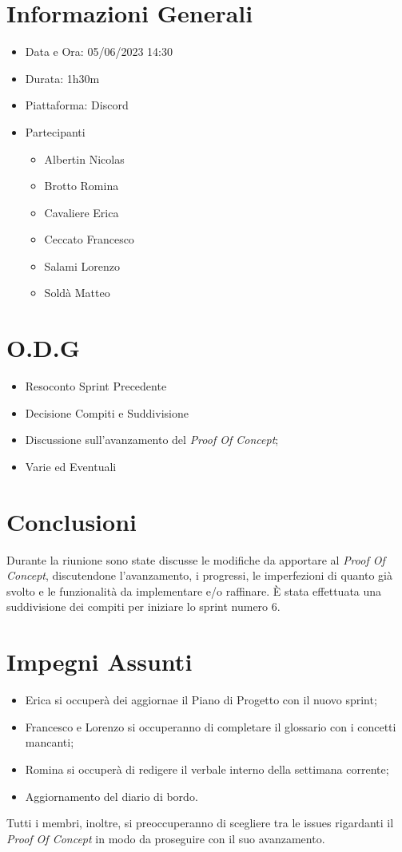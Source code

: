 \documentclass[a4paper, 12pt]{article}
\begin{document}
\makefrontpage

\section*{Informazioni Generali}
\begin{itemize}
    \item Data e Ora: 05/06/2023 14:30
    \item Durata: 1h30m
    \item Piattaforma: Discord
    \item Partecipanti
    \begin{itemize}
        \item Albertin Nicolas
        \item Brotto Romina
        \item Cavaliere Erica
        \item Ceccato Francesco
        \item Salami Lorenzo
        \item Soldà Matteo
    \end{itemize}
\end{itemize}

\section*{O.D.G}
\begin{itemize}
    \item Resoconto Sprint Precedente
    \item Decisione Compiti e Suddivisione
    \item Discussione sull'avanzamento del \textit{Proof Of Concept};
    \item Varie ed Eventuali
\end{itemize}

\section*{Conclusioni}
Durante la riunione sono state discusse le modifiche da apportare al \textit{Proof Of Concept}, discutendone l'avanzamento, i progressi, le imperfezioni di quanto già svolto e le funzionalità da implementare e/o raffinare.
È stata effettuata una suddivisione dei compiti per iniziare lo sprint numero 6.

\section*{Impegni Assunti}
\begin{itemize}
    \item Erica si occuperà dei aggiornae il Piano di Progetto con il nuovo sprint;
    \item Francesco e Lorenzo si occuperanno di completare il glossario con i concetti mancanti;
    \item Romina si occuperà di redigere il verbale interno della settimana corrente;
    \item Aggiornamento del diario di bordo.
\end{itemize}
Tutti i membri, inoltre, si preoccuperanno di scegliere tra le issues rigardanti il \textit{Proof Of Concept} in modo da proseguire con il suo avanzamento.
\end{document}
